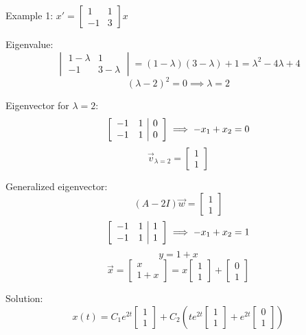 \documentclass[12pt]{article}
\begin{document}
Example 1: $x' = \begin{bmatrix}
    1 & 1\\
    -1 & 3
\end{bmatrix}x$

Eigenvalue:
\[\begin{vmatrix}
    1 - \lambda & 1\\
    -1 & 3 - \lambda
\end{vmatrix} = (1 - \lambda)(3 - \lambda) + 1 = \lambda^2 -4\lambda + 4\]
\[(\lambda - 2)^2 = 0 \implies \lambda = 2\]

Eigenvector for $\lambda = 2$:
\[\left[\begin{array}{c c | c}
    -1 & 1 & 0\\
    -1 & 1 & 0
\end{array}\right] \implies -x_1 + x_2 = 0\]
\[\vec{v}_{\lambda = 2} = \begin{bmatrix}
    1\\1
\end{bmatrix}\]

Generalized eigenvector:
\[(A - 2I)\vec{w} = \begin{bmatrix}
    1\\1
\end{bmatrix}\]
\[\left[\begin{array}{c c |c}
    -1 & 1 & 1\\
    -1 & 1 & 1
\end{array}\right] \implies -x_1 + x_2 = 1\]
\[y = 1 + x\]
\[\vec{x} = \begin{bmatrix}
    x\\
    1 + x
\end{bmatrix} = x \begin{bmatrix}
    1\\1
\end{bmatrix} + \begin{bmatrix}
    0\\1
\end{bmatrix}\]

Solution:
\[\boxed{x(t) = C_1 e^{2t} \begin{bmatrix}
    1\\1
\end{bmatrix} + C_2\left(te^{2t} \begin{bmatrix}
    1\\1
\end{bmatrix} + e^{2t} \begin{bmatrix}
    0\\1
\end{bmatrix}\right)}\]
\end{document}
